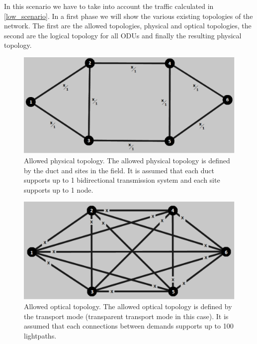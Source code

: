 In this scenario we have to take into account the traffic calculated in \ref{low_scenario}. In a first phase we will show the various existing topologies of the network. The first are the allowed topologies, physical and optical topologies, the second are the logical topology for all ODUs and finally the resulting physical topology.\\

\begin{figure}[H]
\centering
\includegraphics[width=13cm]{sdf/heuristic/transparent_survivability/figures/allowed_physical}
\caption{Allowed physical topology. The allowed physical topology is defined by the duct and sites in the field. It is assumed that each duct supports up to 1 bidirectional transmission system and each site supports up to 1 node.}
\label{allowed_physical_surv_ref_low_heuristic_transparent}
\end{figure}

\begin{figure}[H]
\centering
\includegraphics[width=13cm]{sdf/heuristic/transparent_survivability/figures/allowed_optical}
\caption{Allowed optical topology. The allowed optical topology is defined by the transport mode (transparent transport mode in this case). It is assumed that each connections between demands supports up to 100 lightpaths.}
\label{allowed_optical_surv_ref_low_heuristic_transparent}
\end{figure}

